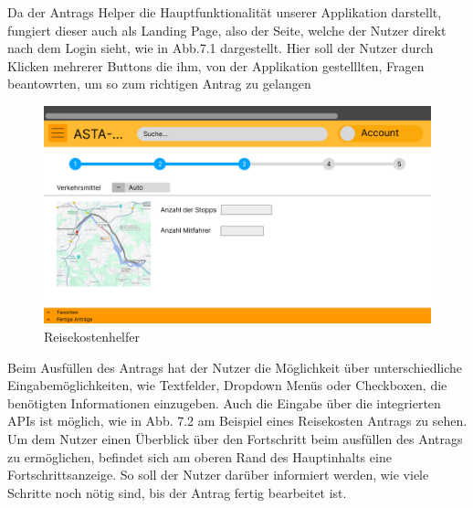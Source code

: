 Da der Antrags Helper die Hauptfunktionalität unserer Applikation darstellt, fungiert
dieser auch als Landing Page, also der Seite, welche der Nutzer direkt nach dem Login
sieht, wie in Abb.7.1 dargestellt. Hier soll der Nutzer durch Klicken mehrerer Buttons die
ihm, von der Applikation gestelllten, Fragen beantowrten, um so zum richtigen Antrag zu
gelangen

\begin{figure}[h]
  \centering
    \includegraphics[width=1.0\textwidth]{Doc/images/Reisekostenhelper.png}
    \caption{Reisekostenhelfer}
\end{figure}

Beim Ausfüllen des Antrags hat der Nutzer die Möglichkeit über unterschiedliche Eingabemöglichkeiten, wie Textfelder, Dropdown Menüs oder Checkboxen, die benötigten Informationen einzugeben. Auch die Eingabe über die integrierten APIs ist möglich, wie in Abb. 7.2 am Beispiel eines Reisekosten Antrags zu sehen. Um dem Nutzer einen Überblick über den Fortschritt beim ausfüllen des Antrags zu ermöglichen, befindet sich am oberen Rand des Hauptinhalts eine Fortschrittsanzeige. So soll der Nutzer darüber informiert werden, wie viele Schritte noch nötig sind, bis der Antrag fertig bearbeitet ist. 